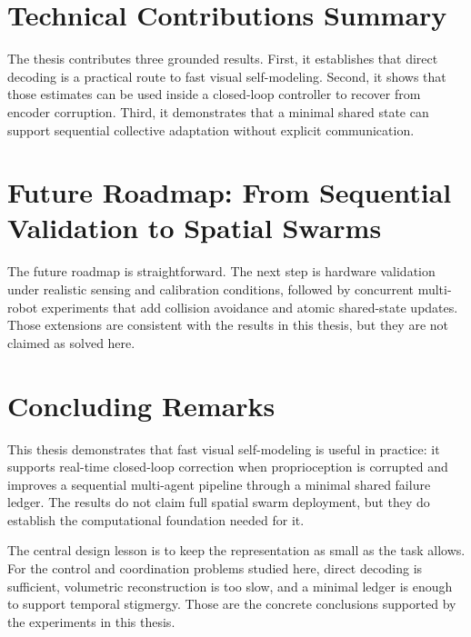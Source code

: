 \documentclass[12pt,a4paper,oneside]{report}
\begin{document}
\section{Technical Contributions Summary}

The thesis contributes three grounded results. First, it establishes that direct decoding is a practical route to fast visual self-modeling. Second, it shows that those estimates can be used inside a closed-loop controller to recover from encoder corruption. Third, it demonstrates that a minimal shared state can support sequential collective adaptation without explicit communication.

\section{Future Roadmap: From Sequential Validation to Spatial Swarms}

The future roadmap is straightforward. The next step is hardware validation under realistic sensing and calibration conditions, followed by concurrent multi-robot experiments that add collision avoidance and atomic shared-state updates. Those extensions are consistent with the results in this thesis, but they are not claimed as solved here.

\section{Concluding Remarks}

This thesis demonstrates that fast visual self-modeling is useful in practice: it supports real-time closed-loop correction when proprioception is corrupted and improves a sequential multi-agent pipeline through a minimal shared failure ledger. The results do not claim full spatial swarm deployment, but they do establish the computational foundation needed for it.

The central design lesson is to keep the representation as small as the task allows. For the control and coordination problems studied here, direct decoding is sufficient, volumetric reconstruction is too slow, and a minimal ledger is enough to support temporal stigmergy. Those are the concrete conclusions supported by the experiments in this thesis.

\clearpage
\end{document}
